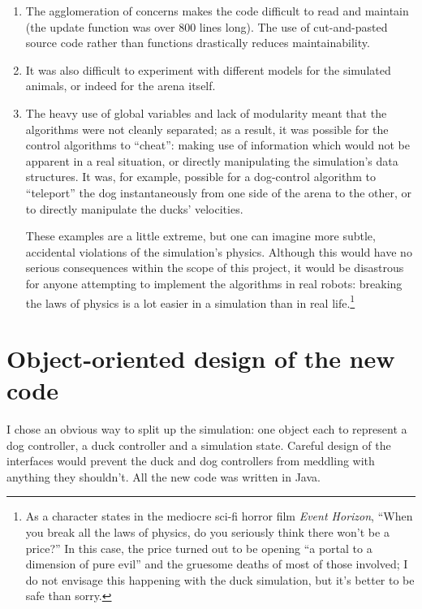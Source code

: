 \documentclass[a4paper]{report}
\begin{document}
\begin{enumerate}
  
\item The agglomeration of concerns makes the code difficult to read
  and maintain (the update function was over 800 lines long).  The use
  of cut-and-pasted source code rather than functions drastically
  reduces maintainability.
  
\item It was also difficult to experiment with different
  models for the simulated animals, or indeed for the arena itself.
  
\item The heavy use of global variables and lack of modularity meant
  that the algorithms were not cleanly separated; as a result, it was
  possible for the control algorithms to ``cheat'': making use of
  information which would not be apparent in a real situation, or
  directly manipulating the simulation's data structures. It was, for
  example, possible for a dog-control algorithm to ``teleport'' the
  dog instantaneously from one side of the arena to the other, or to
  directly manipulate the ducks' velocities.
  
  These examples are a little extreme, but one can imagine more
  subtle, accidental violations of the simulation's physics. Although
  this would have no serious consequences within the scope of this
  project, it would be disastrous for anyone attempting to implement
  the algorithms in real robots: breaking the laws of physics is a lot
  easier in a simulation than in real life.\footnote{As a character
    states in the mediocre sci-fi horror film \emph{Event Horizon},
    ``When you break all the laws of physics, do you seriously think
    there won't be a price?'' In this case, the price turned out to be
    opening ``a portal to a dimension of pure evil'' and the gruesome
    deaths of most of those involved; I do not envisage this happening
    with the duck simulation, but it's better to be safe than sorry.}

\end{enumerate}

\section{Object-oriented design of the new code}

I chose an obvious way to split up the simulation: one object each to
represent a dog controller, a duck controller and a simulation state.
Careful design of the interfaces would prevent the duck and dog
controllers from meddling with anything they shouldn't. All the new
code was written in Java.
\end{document}
